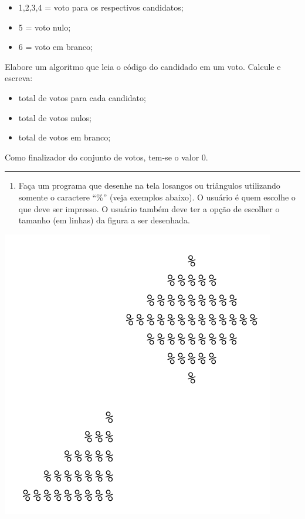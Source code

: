 \documentclass[12pt,a4paper]{article}
\providecommand{\tightlist}{%
      \setlength{\itemsep}{0pt}\setlength{\parskip}{0pt}}
\begin{document}
\begin{itemize}
\item
  1,2,3,4 = voto para os respectivos candidatos;
\item
  5 = voto nulo;
\item
  6 = voto em branco;
\end{itemize}

Elabore um algoritmo que leia o código do candidado em um voto. Calcule
e escreva:

\begin{itemize}
\item
  total de votos para cada candidato;
\item
  total de votos nulos;
\item
  total de votos em branco;
\end{itemize}

Como finalizador do conjunto de votos, tem-se o valor 0.

    \begin{center}\rule{0.5\linewidth}{0.5pt}\end{center}

\begin{enumerate}
\def\labelenumi{\arabic{enumi}.}
\setcounter{enumi}{10}
\tightlist
\item
  Faça um programa que desenhe na tela losangos ou triângulos utilizando
  somente o caractere ``\%'' (veja exemplos abaixo). O usuário é quem
  escolhe o que deve ser impresso. O usuário também deve ter a opção de
  escolher o tamanho (em linhas) da figura a ser desenhada.
\end{enumerate}

\includegraphics{"figs/cap4ex1.png"}
\end{document}
